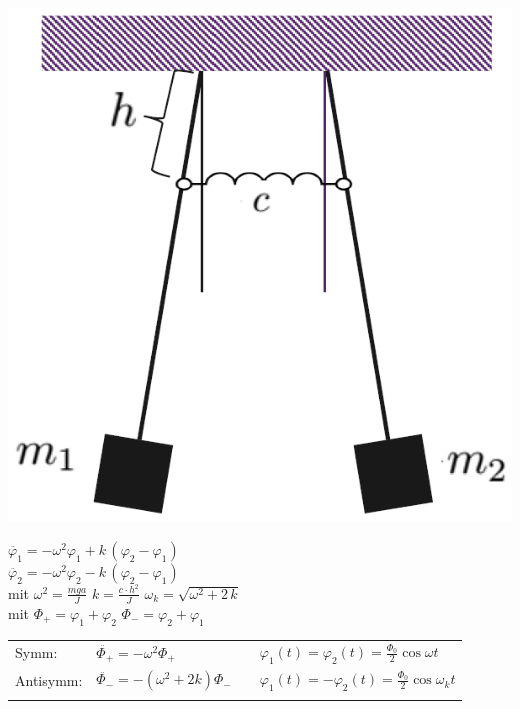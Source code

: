\begin{minipage}{0.25\linewidth}
    \includegraphics[width=0.95\linewidth]{Bilder/Wellen-Optik/gekoppelte_pendel} 
\end{minipage}
\hfill
\begin{minipage}{0.74\linewidth}
    $ \ddot{\varphi_1} = - \omega^2 \varphi_1 + k \, (\varphi_2 - \varphi_1)$ \\
    $ \ddot{\varphi_2} = - \omega^2 \varphi_2 - k \, (\varphi_2 - \varphi_1)$ \\

    mit $ \omega^2 = \frac{mga}{J}$ \quad $k = \frac{c \cdot h^2}{J}$ \quad $\omega_k = \sqrt{\omega^2 + 2 \, k}$ \\
    
    mit $\Phi_+ = \varphi_1 + \varphi_2$ \qquad $\Phi_- = \varphi_2 + \varphi_1$ \\

    \begin{tabular}{llll}
        Symm: & $\ddot{\Phi_+} = - \omega^2 \Phi_+ $ &  &  $\varphi_1(t) = \varphi_2(t) = \frac{\Phi_0}{2} \cos{ \omega t} $\\
        Antisymm: & $\ddot{\Phi_-} = - (\omega^2 + 2k) \Phi_- $ &  & $\varphi_1(t) = -\varphi_2(t) = \frac{\Phi_0}{2} \cos{ \omega_k t} $ \\
        \\
    \end{tabular}
\end{minipage}








